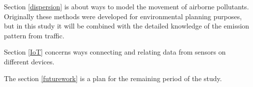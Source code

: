 Section \ref{dispersion} is about ways to model the movement of airborne pollutants. Originally these methods were developed for environmental planning purposes, but in this study it will be combined with the detailed knowledge of the emission pattern from traffic.

Section \ref{IoT} concerns ways connecting and relating data from sensors on different devices.

The section \ref{futurework} is a plan for the remaining period of the study.

